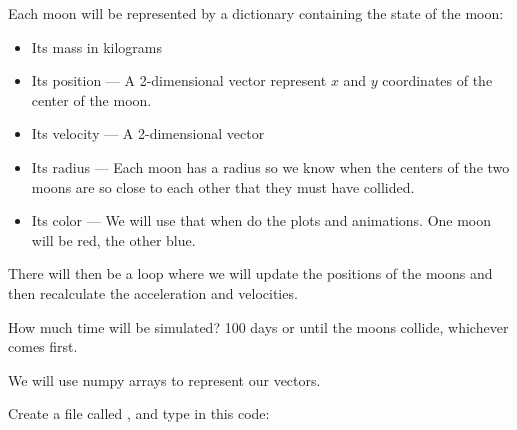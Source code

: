 Each moon will be represented by a dictionary containing the state of the moon:
\begin{itemize}
\item Its mass in kilograms
\item Its position --- A 2-dimensional vector represent $x$ and $y$ coordinates of the center of the moon.
\item Its velocity --- A 2-dimensional vector
\item Its radius --- Each moon has a radius so we know when the centers of the two moons are so close to each other that they must have collided.
\item Its color --- We will use that when do the plots and animations.  One moon will be red, the other blue.
\end{itemize}

There will then be a loop where we will update the positions of the moons and then recalculate the 
acceleration and velocities.    

How much time will be simulated?  100 days or until the moons collide,  whichever
comes first.

We will use numpy arrays to represent our vectors.

Create a file called , and type in this code:

